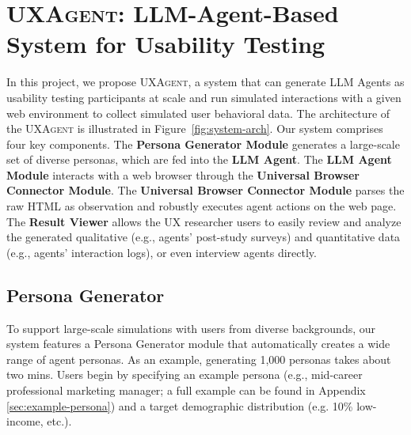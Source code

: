 \documentclass[manuscript,review,anonymous]{acmart}
\DeclareRobustCommand{\projectname}{\textsc{UXAgent}\xspace}
\begin{document}
\section{\projectname: LLM-Agent-Based System for Usability Testing}


In this project, we propose \projectname, a system that can generate LLM Agents as usability testing participants at scale and run simulated interactions with a given web environment to collect simulated user behavioral data.
The architecture of the \projectname{} is illustrated in Figure~\ref{fig:system-arch}. Our system comprises four key components.
The \textbf{Persona Generator Module} generates a large-scale set of diverse personas, which are fed into the \textbf{LLM Agent}. 
The \textbf{LLM Agent Module} interacts with a web browser through the \textbf{Universal Browser Connector Module}.
The \textbf{Universal Browser Connector Module} parses the raw HTML as observation and robustly executes agent actions on the web page.
The \textbf{Result Viewer} allows the UX researcher users to easily review and analyze the generated qualitative (e.g., agents' post-study surveys) and quantitative data (e.g., agents' interaction logs), or even interview agents directly. 

\subsection{Persona Generator}

To support large-scale simulations with users from diverse backgrounds, our system features a Persona Generator module that automatically creates a wide range of agent personas.  As an example, generating 1,000 personas takes about two mins.
Users begin by specifying an example persona (e.g., mid-career professional marketing manager; a full example can be found in Appendix \ref{sec:example-persona}) and a target demographic distribution (e.g. 10\% low-income, etc.).
\end{document}
